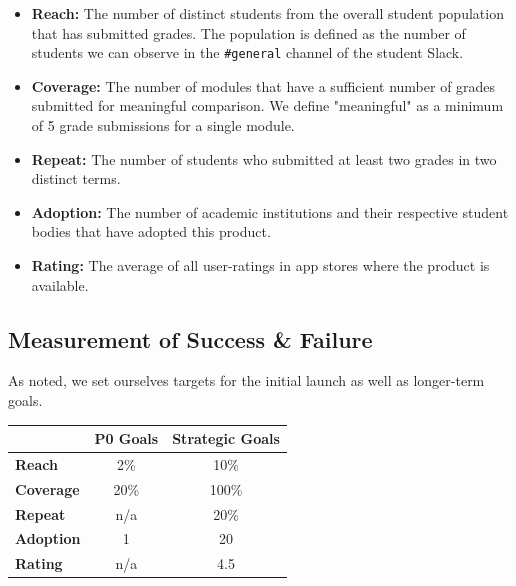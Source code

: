 \begin{itemize}
    \item \textbf{Reach:} The number of distinct students from the overall student population that has submitted grades. The population is defined as the number of students we can observe in the \texttt{\#general} channel of the student Slack. 
    \item \textbf{Coverage:} The number of modules that have a sufficient number of grades submitted for meaningful comparison. We define "meaningful" as a minimum of 5 grade submissions for a single module.
    \item \textbf{Repeat:} The number of students who submitted at least two grades in two distinct terms.
    \item \textbf{Adoption:} The number of academic institutions and their respective student bodies that have adopted this product.
   \item \textbf{Rating:} The average of all user-ratings in app stores where the product is available.
\end{itemize}

\subsection{Measurement of Success \& Failure}
As noted, we set ourselves targets for the initial launch as well as longer-term goals.

\begin{table}[H]
\centering
\begin{tabular}{@{}lcc@{}}
\toprule
                  & \multicolumn{1}{l}{\textbf{P0 Goals}} & \multicolumn{1}{l}{\textbf{Strategic Goals}} \\ \midrule
\textbf{Reach}    & 2\%                                   & 10\%                                         \\
\textbf{Coverage} & 20\%                                  & 100\%                                        \\
\textbf{Repeat}   & n/a                                   & 20\%                                         \\
\textbf{Adoption} & 1                                     & 20                                           \\
\textbf{Rating}   & n/a                                   & 4.5                                          \\ \bottomrule
\end{tabular}
\end{table}

